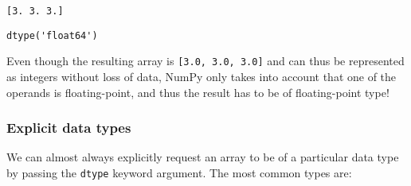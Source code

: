 \documentclass{scrartcl}
\makeatletter
\newcommand{\boxspacing}{\kern\kvtcb@left@rule\kern\kvtcb@boxsep}
\newcommand{\prompt}[4]{
        {\ttfamily\llap{{\color{#2}[#3]:\hspace{3pt}#4}}\vspace{-\baselineskip}}
    }
\makeatother
\begin{document}
    \begin{Verbatim}[commandchars=\\\{\}]
[3. 3. 3.]
    \end{Verbatim}

            \begin{tcolorbox}[breakable, size=fbox, boxrule=.5pt, pad at break*=1mm, opacityfill=0]
\prompt{Out}{outcolor}{78}{\boxspacing}
\begin{Verbatim}[commandchars=\\\{\}]
dtype('float64')
\end{Verbatim}
\end{tcolorbox}
        
    Even though the resulting array is \texttt{{[}3.0,\ 3.0,\ 3.0{]}} and
can thus be represented as integers without loss of data, NumPy only
takes into account that one of the operands is floating-point, and thus
the result has to be of floating-point type!

    \hypertarget{explicit-data-types}{%
\subsubsection{Explicit data types}\label{explicit-data-types}}

We can almost always explicitly request an array to be of a particular
data type by passing the \texttt{dtype} keyword argument. The most
common types are:
\end{document}
